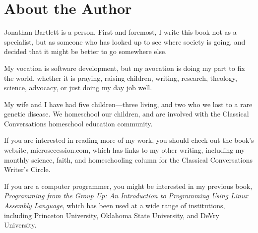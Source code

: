 \chapter*{About the Author}

Jonathan Bartlett is a person.  First and foremost, I write this book not
as a specialist, but as someone who has looked up to see where society is 
going, and decided that it might be better to go somewhere else.  

My vocation is software development, but my avocation is doing my part
to fix the world, whether it is praying, raising children, writing, research,
theology, science, advocacy, or just doing my day job well.

My wife and I have had five children---three living, and two who we lost
to a rare genetic disease.  We homeschool our children, and are involved
with the Classical Conversations homeschool education community.

If you are interested in reading more of my work, you should check out
the book's website, microsecession.com, which has links to my other
writing, including my monthly science, faith, and homeschooling column 
for the Classical Conversations Writer's Circle.  

If you are a computer
programmer, you might be interested in my previous book,
\textit{Programming from the Group Up: An Introduction to Programming
Using Linux Assembly Language}, which has been used at a wide range
of institutions, including Princeton University, Oklahoma State University, 
and DeVry University.
